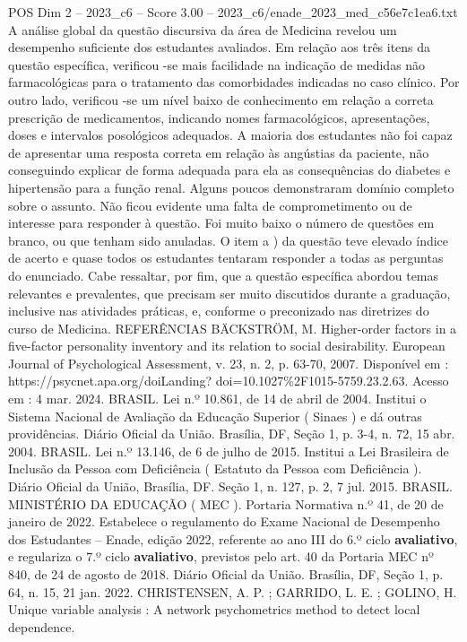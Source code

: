\begin{textsample}{POS Dim 2 – 2023\_c6 – Score 3.00 – 2023\_c6/enade\_2023\_med\_c56e7c1ea6.txt}
A análise global da questão discursiva da área de Medicina revelou um desempenho suficiente dos estudantes avaliados.
Em relação aos três itens da questão específica, verificou -se mais facilidade na indicação de medidas não farmacológicas para o tratamento das comorbidades indicadas no caso clínico.
Por outro lado, verificou -se um nível baixo de conhecimento em relação a correta prescrição de medicamentos, indicando nomes farmacológicos, apresentações, doses e intervalos posológicos adequados.
A maioria dos estudantes não foi capaz de apresentar uma resposta correta em relação às angústias da paciente, não conseguindo explicar de forma adequada para ela as consequências do diabetes e hipertensão para a função renal.
Alguns poucos demonstraram domínio completo sobre o assunto.
Não ficou evidente uma falta de comprometimento ou de interesse para responder à questão.
Foi muito baixo o número de questões em branco, ou que tenham sido anuladas.
O item a ) da questão teve elevado índice de acerto e quase todos os estudantes tentaram responder a todas as perguntas do enunciado.
Cabe ressaltar, por fim, que a questão específica abordou temas relevantes e prevalentes, que precisam ser muito discutidos durante a graduação, inclusive nas atividades práticas, e, conforme o preconizado nas diretrizes do curso de Medicina.
REFERÊNCIAS BÄCKSTRÖM, M.
Higher-order factors in a five-factor personality inventory and its relation to social desirability.
European Journal of Psychological Assessment, v. 23, n. 2, p. 63-70, 2007.
Disponível em : https://psycnet.apa.org/doiLanding? doi=10.1027\%2F1015-5759.23.2.63.
Acesso em : 4 mar. 2024.
BRASIL.
Lei n.º 10.861, de 14 de abril de 2004.
Institui o Sistema Nacional de Avaliação da Educação Superior ( Sinaes ) e dá outras providências.
Diário Oficial da União.
Brasília, DF, Seção 1, p. 3-4, n. 72, 15 abr. 2004.
BRASIL.
Lei n.º 13.146, de 6 de julho de 2015.
Institui a Lei Brasileira de Inclusão da Pessoa com Deficiência ( Estatuto da Pessoa com Deficiência ).
Diário Oficial da União, Brasília, DF.
Seção 1, n. 127, p. 2, 7 jul. 2015.
BRASIL.
MINISTÉRIO DA EDUCAÇÃO ( MEC ).
Portaria Normativa n.º 41, de 20 de janeiro de 2022.
Estabelece o regulamento do Exame Nacional de Desempenho dos Estudantes – Enade, edição 2022, referente ao ano III do 6.º ciclo \textbf{avaliativo}, e regulariza o 7.º ciclo \textbf{avaliativo}, previstos pelo art. 40 da Portaria MEC nº 840, de 24 de agosto de 2018.
Diário Oficial da União.
Brasília, DF, Seção 1, p. 64, n. 15, 21 jan. 2022.
CHRISTENSEN, A.
P. ; GARRIDO, L.
E. ; GOLINO, H.
Unique variable analysis : A network psychometrics method to detect local dependence.

\end{textsample}
